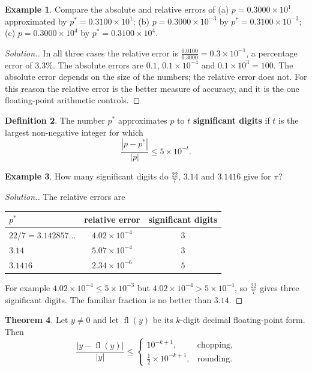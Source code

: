 \documentclass[11pt,a4paper]{article}
\numberwithin{equation}{section}
\DeclareMathOperator{\fl}{fl}
\theoremstyle{definition}
\newtheorem{thm}{Theorem}[subsection]
\newtheorem{defn}[thm]{Definition}
\newtheorem{exa}[thm]{Example}
\newenvironment{solution}
  {\renewcommand{\qedsymbol}{}\begin{proof}[\textit{Solution}.]}
  {\end{proof}}
\begin{document}
\begin{exa}
\label{exa:abserr}
Compare the absolute and relative errors of (a) $p = 0.3000\times10^1$ approximated by $p^* = 0.3100\times10^1$; (b) $p = 0.3000\times
10^{-3}$ by $p^* = 0.3100\times10^{-3}$; (c) $p = 0.3000\times10^4$ by $p^* = 0.3100\times10^4$.
\end{exa}

\begin{solution}
In all three cases the relative error is $\frac{0.0100}{0.3000} = 0.\overline{3}\times10^{-1}$, a percentage error of $3.\overline{3}\%$. The
absolute errors are $0.1$, $0.1\times10^{-4}$ and $0.1\times10^3 = 100$. The absolute error depends on the size of the numbers; the
relative error does not. For this reason the relative error is the better measure of accuracy, and it is the one floating-point
arithmetic controls.
\end{solution}

\begin{defn}
The number $p^*$ approximates $p$ to $t$ \textbf{significant digits} if $t$ is the largest non-negative integer for which
$$\frac{|p-p^*|}{|p|}\leq5\times10^{-t}.$$
\end{defn}

\begin{exa}
How many significant digits do $\frac{22}{7}$, $3.14$ and $3.1416$ give for $\pi$?
\end{exa}

\begin{solution}
The relative errors are
\begin{center}
\begin{tabular}{lcc}
\hline
$p^*$ & relative error & significant digits\\
\hline
$22/7 = 3.142857\ldots$ & $4.02\times10^{-4}$ & $3$\\
$3.14$ & $5.07\times10^{-4}$ & $3$\\
$3.1416$ & $2.34\times10^{-6}$ & $5$\\
\hline
\end{tabular}
\end{center}
For example $4.02\times10^{-4}\leq5\times10^{-3}$ but $4.02\times10^{-4}>5\times10^{-4}$, so $\frac{22}{7}$ gives three significant
digits. The familiar fraction is no better than $3.14$.
\end{solution}

\begin{thm}
\label{thm:fl}
Let $y\neq0$ and let $\fl(y)$ be its $k$-digit decimal floating-point form. Then
$$\frac{|y-\fl(y)|}{|y|}\leq\begin{cases}10^{-k+1}, & \text{chopping},\\[2pt] \tfrac12\times10^{-k+1}, & \text{rounding}.\end{cases}$$
\end{thm}
\end{document}
